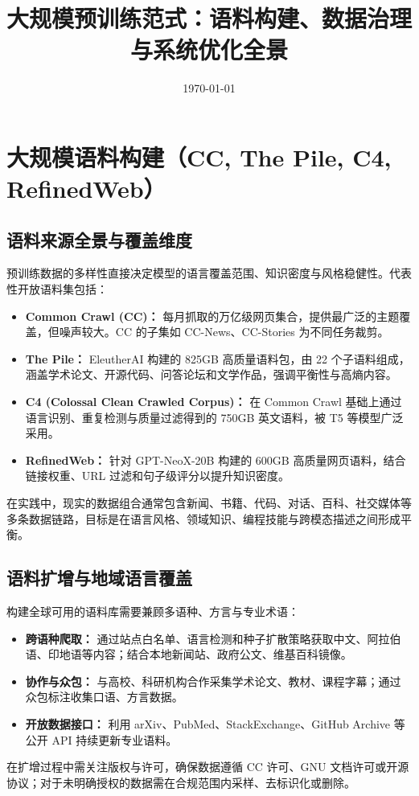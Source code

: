 \documentclass[UTF8,zihao=-4]{ctexart}
\title{大规模预训练范式：语料构建、数据治理与系统优化全景}
\author{}
\date{\today}
\begin{document}
\maketitle

\section{大规模语料构建（CC, The Pile, C4, RefinedWeb）}
\subsection{语料来源全景与覆盖维度}
预训练数据的多样性直接决定模型的语言覆盖范围、知识密度与风格稳健性。代表性开放语料集包括：
\begin{itemize}
  \item \textbf{Common Crawl (CC)：} 每月抓取的万亿级网页集合，提供最广泛的主题覆盖，但噪声较大。CC 的子集如 CC-News、CC-Stories 为不同任务裁剪。
  \item \textbf{The Pile：} EleutherAI 构建的 825GB 高质量语料包，由 22 个子语料组成，涵盖学术论文、开源代码、问答论坛和文学作品，强调平衡性与高熵内容。
  \item \textbf{C4 (Colossal Clean Crawled Corpus)：} 在 Common Crawl 基础上通过语言识别、重复检测与质量过滤得到的 750GB 英文语料，被 T5 等模型广泛采用。
  \item \textbf{RefinedWeb：} 针对 GPT-NeoX-20B 构建的 600GB 高质量网页语料，结合链接权重、URL 过滤和句子级评分以提升知识密度。
\end{itemize}
在实践中，现实的数据组合通常包含新闻、书籍、代码、对话、百科、社交媒体等多条数据链路，目标是在语言风格、领域知识、编程技能与跨模态描述之间形成平衡。

\subsection{语料扩增与地域语言覆盖}
构建全球可用的语料库需要兼顾多语种、方言与专业术语：
\begin{itemize}
  \item \textbf{跨语种爬取：} 通过站点白名单、语言检测和种子扩散策略获取中文、阿拉伯语、印地语等内容；结合本地新闻站、政府公文、维基百科镜像。
  \item \textbf{协作与众包：} 与高校、科研机构合作采集学术论文、教材、课程字幕；通过众包标注收集口语、方言数据。
  \item \textbf{开放数据接口：} 利用 arXiv、PubMed、StackExchange、GitHub Archive 等公开 API 持续更新专业语料。
\end{itemize}
在扩增过程中需关注版权与许可，确保数据遵循 CC 许可、GNU 文档许可或开源协议；对于未明确授权的数据需在合规范围内采样、去标识化或删除。
\end{document}
